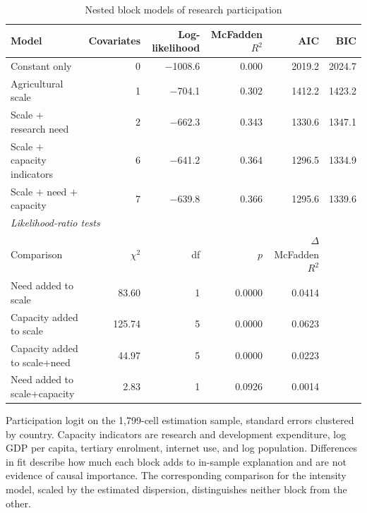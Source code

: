 \begin{table}[!t]
\centering
\caption{Nested block models of research participation}
\label{tab:blocks}
\begin{tabular*}{\textwidth}{@{\extracolsep\fill}l r r r r r@{}}
\toprule
Model & Covariates & Log-likelihood & McFadden $R^2$ & AIC & BIC \\
\midrule
Constant only & 0 & $-$1008.6 & 0.000 & 2019.2 & 2024.7 \\
Agricultural scale & 1 & $-$704.1 & 0.302 & 1412.2 & 1423.2 \\
Scale $+$ research need & 2 & $-$662.3 & 0.343 & 1330.6 & 1347.1 \\
Scale $+$ capacity indicators & 6 & $-$641.2 & 0.364 & 1296.5 & 1334.9 \\
Scale $+$ need $+$ capacity & 7 & $-$639.8 & 0.366 & 1295.6 & 1339.6 \\
\midrule
\multicolumn{6}{l}{\textit{Likelihood-ratio tests}} \\
Comparison & $\chi^2$ & df & $p$ & $\Delta$ McFadden $R^2$ & \\
Need added to scale & 83.60 & 1 & 0.0000 & 0.0414 & \\
Capacity added to scale & 125.74 & 5 & 0.0000 & 0.0623 & \\
Capacity added to scale+need & 44.97 & 5 & 0.0000 & 0.0223 & \\
Need added to scale+capacity & 2.83 & 1 & 0.0926 & 0.0014 & \\
\bottomrule
\end{tabular*}
\begin{tablenotes}
\item[] Participation logit on the 1,799-cell estimation sample, standard errors clustered by country. Capacity indicators are research and development expenditure, log GDP per capita, tertiary enrolment, internet use, and log population. Differences in fit describe how much each block adds to in-sample explanation and are not evidence of causal importance. The corresponding comparison for the intensity model, scaled by the estimated dispersion, distinguishes neither block from the other.
\end{tablenotes}
\end{table}
